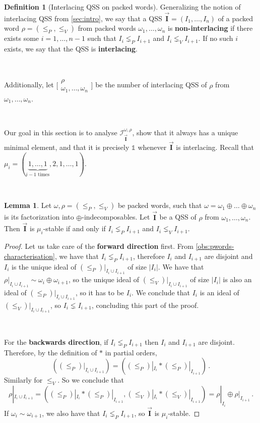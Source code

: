 \documentclass[12pt, reqno]{amsart}
\theoremstyle{definition}
\newtheorem{lm}[thm]{Lemma}
\newtheorem{defin}[thm]{Definition}
\newcommand{\III}{\vec{\mathbf{I}}}
\begin{document}
\begin{defin}[Interlacing QSS on packed words]
Generalizing the notion of interlacing QSS from \cref{sec:intro}, we say that a QSS $\III = (I_1, \dots, I_n)$ of a packed word $\rho = (\leq_P, \leq_V)$ from packed words $\omega_1, \dots, \omega_n$ is \textbf{non-interlacing} if there exists some $i = 1, \dots, n-1$ such that $I_i \lneq_P I_{i+1}$ and $I_i \lneq_V I_{i+1}$.
If no such $i$ exists, we say that the QSS is \textbf{interlacing}.

\

Additionally, let $ \bigl[\!\begin{smallmatrix} \rho  \\ \omega_1, \dots, \omega_n \end{smallmatrix}\!\bigr]$ be the number of interlacing QSS of $\rho$ from $\omega_1, \dots, \omega_n$.
\end{defin}

\

Our goal in this section is to analyse $\mathcal I^{\omega, \rho}_{\III}$, show that it always has a unique minimal element, and that it is precisely $\mathbb{1}$ whenever $\III$ is interlacing.
Recall that $\mu_i = (\underbrace{1, \dots , 1}_\text{$i-1$ times}, 2, 1, \dots, 1)$.

\

\begin{lm}\label{lm:QSSpackedWords}
Let $\omega, \rho = (\leq_P, \leq_V)$ be packed words, such that $\omega = \omega_1 \oplus \dots \oplus \omega_n$ is its factorization into $\oplus$-indecomposables.
Let $\III$ be a QSS of $\rho$ from $\omega_1, \dots , \omega_n$.
Then $\III$ is $\mu_i$-stable if and only if $I_i \lneq_P I_{i+1}$ and $I_i \lneq_V I_{i+1}$.
\end{lm}


\begin{proof}
Let us take care of the \textbf{forward direction} first.
From \cref{obs:pwords-characterisation}, we have that $I_i \lneq_P I_{i+1}$, therefore $I_i$ and $I_{i+1}$ are disjoint and $I_i$ is the unique ideal of $(\leq_P)|_{I_i \cup I_{i+1}}$ of size $|I_i|$.
We have that $\rho|_{I_i \cup I_{i+1}} \sim \omega_i \oplus \omega_{i+1}$, so the unique ideal of $(\leq_V)|_{I_i \cup I_{i+1}}$ of size $|I_i|$ is also an ideal of $(\leq_P)|_{I_i \cup I_{i+1}}$, so it has to be $I_i$.
We conclude that $I_i$ is an ideal of $(\leq_V)|_{I_i \cup I_{i+1}}$, so $I_i \lneq I_{i+1}$, concluding this part of the proof.

\

For the \textbf{backwards direction}, if $I_i \lneq_P I_{i+1}$ then $I_i$ and $I_{i+1}$ are disjoint.
Therefore, by the definition of $\ast $ in partial orders, 
$$((\leq_P)|_{I_i \cup I_{i+1}}) = ((\leq_P)|_{I_i} \ast (\leq_P)|_{I_{i+1}})\, . $$
Similarly for $\leq_V$.
So we conclude that 
$$\rho|_{I_i \cup I_{i+1}} = ((\leq_P)|_{I_i} \ast (\leq_P)|_{I_{i+1}}, (\leq_V)|_{I_i} \ast (\leq_V)|_{I_{i+1}}) = \rho|_{I_i} \oplus \rho|_{I_{i+1}}\, .  $$
If $\omega_i \sim \omega_{i+1}$, we also have that $I_i \lneq_P I_{i+1}$, so $\III$ is $\mu_i$-stable.
\end{proof}
\end{document}
